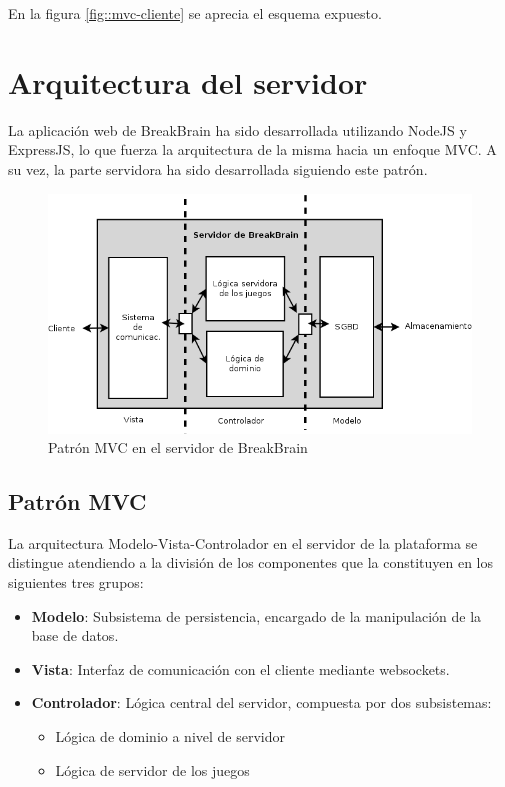 En la figura \ref{fig::mvc-cliente} se aprecia el esquema expuesto.

\section{Arquitectura del servidor}

La aplicación web de BreakBrain ha sido desarrollada utilizando NodeJS y ExpressJS, lo que fuerza la arquitectura de la misma hacia un enfoque \acf{MVC}. A su vez, la parte servidora ha sido desarrollada siguiendo este patrón.

\begin{figure}[H]
  \begin{center}
    \includegraphics[width=\textwidth]{images/mvc-servidor.png}
    \caption{Patrón MVC en el servidor de BreakBrain}
    \label{fig::mvc-servidor}
  \end{center}
\end{figure}

\subsection{Patrón MVC}

La arquitectura Modelo-Vista-Controlador en el servidor de la plataforma se distingue atendiendo a la división de los componentes que la constituyen en los siguientes tres grupos:

\begin{itemize}
\item {\bf Modelo}: Subsistema de persistencia, encargado de la manipulación de la base de datos.
\item {\bf Vista}: Interfaz de comunicación con el cliente mediante websockets.
\item {\bf Controlador}: Lógica central del servidor, compuesta por dos subsistemas:

  \begin{itemize}
  \item Lógica de dominio a nivel de servidor
  \item Lógica de servidor de los juegos
  \end{itemize}
\end{itemize}

